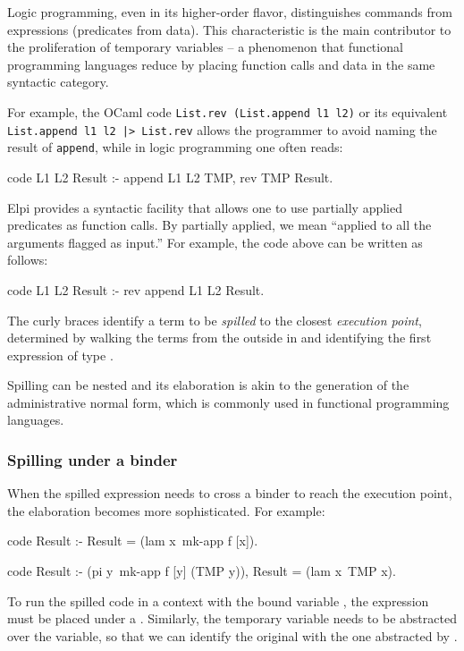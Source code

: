 \documentclass[a4paper, 11pt]{book}
\begin{document}
Logic programming, even in its higher-order flavor, distinguishes commands
from expressions (predicates from data). This characteristic is the main
contributor to the proliferation of temporary variables -- a phenomenon that
functional programming languages reduce by placing function calls and data in
the same syntactic category.

For example, the OCaml code \texttt{List.rev (List.append l1 l2)} or its
equivalent \texttt{List.append l1 l2 |> List.rev} allows the programmer to
avoid naming the result of \texttt{append}, while in logic programming one
often reads:

\begin{elpicode}
code L1 L2 Result :- append L1 L2 TMP, rev TMP Result.
\end{elpicode}

Elpi provides a syntactic facility that allows one to use partially applied
predicates as function calls. By partially applied, we mean ``applied to all
the arguments flagged as input.'' For example, the code above can be written as
follows:

\begin{elpicode}
code L1 L2 Result :- rev {append L1 L2} Result.
\end{elpicode}

The curly braces identify a term to be \emph{spilled} to the closest
\emph{execution point}, determined by walking the terms from the outside in
and identifying the first expression of type .

Spilling can be nested and its elaboration is akin to the generation of the
administrative normal form, which is commonly used in functional programming
languages.

\subsubsection{Spilling under a binder}


When the spilled expression needs to cross a binder to reach the execution
point, the elaboration becomes more sophisticated. For example:

\begin{elpicode}
code Result :- Result = (lam x\ {mk-app f [x]}).

code Result :- (pi y\ mk-app f [y] (TMP y)), Result = (lam x\ TMP x).
\end{elpicode}

\noindent
To run the spilled code in a context with the bound variable , the
expression must be placed under a . Similarly, the temporary
variable  needs to be abstracted over the variable, so that we can identify
the original  with the one abstracted by .
\end{document}
